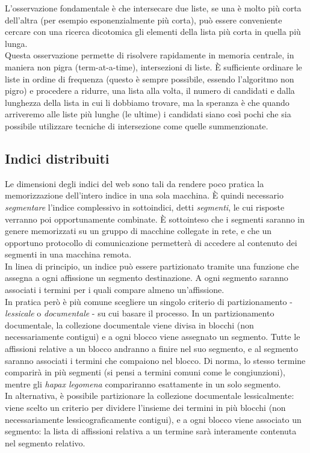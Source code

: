 L'osservazione fondamentale è che intersecare due liste, se una è molto più corta dell'altra (per esempio esponenzialmente più corta), può essere conveniente cercare con una ricerca dicotomica gli elementi della lista più corta in quella più lunga.\\
Questa osservazione permette di risolvere rapidamente in memoria centrale, in maniera non pigra (term-at-a-time), intersezioni di liste. È sufficiente ordinare le liste in ordine di frequenza (questo è sempre possibile, essendo l'algoritmo non pigro) e procedere a ridurre, una lista alla volta, il numero di candidati e dalla lunghezza della lista in cui li dobbiamo trovare, ma la speranza è che quando arriveremo alle liste più lunghe (le ultime) i candidati siano così pochi che sia possibile utilizzare tecniche di intersezione come quelle summenzionate.
\subsection{Indici distribuiti}
Le dimensioni degli indici del web sono tali da rendere poco pratica la memorizzazione dell'intero indice in una sola macchina. È quindi necessario \textit{segmentare} l'indice complessivo in sottoindici, detti \textit{segmenti}, le cui risposte verranno poi opportunamente combinate. È sottointeso che i segmenti saranno in genere memorizzati su un gruppo di macchine collegate in rete, e che un opportuno protocollo di comunicazione permetterà di accedere al contenuto dei segmenti in una macchina remota.\\
In linea di principio, un indice può essere partizionato tramite una funzione che assegna a ogni affissione un segmento destinazione. A ogni segmento saranno associati i termini per i quali compare almeno un'affissione.\\
In pratica però è più comune scegliere un singolo criterio di partizionamento - \textit{lessicale} o \textit{documentale} - su cui basare il processo. In un partizionamento documentale, la collezione documentale viene divisa in blocchi (non necessariamente contigui) e a ogni blocco viene assegnato un segmento. Tutte le affissioni relative a un blocco andranno a finire nel suo segmento, e al segmento saranno associati i termini che compaiono nel blocco. Di norma, lo stesso termine comparirà in più segmenti (si pensi a termini comuni come le congiunzioni), mentre gli \textit{hapax legomena} compariranno esattamente in un solo segmento.\\
In alternativa, è possibile partizionare la collezione documentale lessicalmente: viene scelto un criterio per dividere l'insieme dei termini in più blocchi (non necessariamente lessicograficamente contigui), e a ogni blocco viene associato un segmento: la lista di affissioni relativa a un termine sarà interamente contenuta nel segmento relativo.\\
